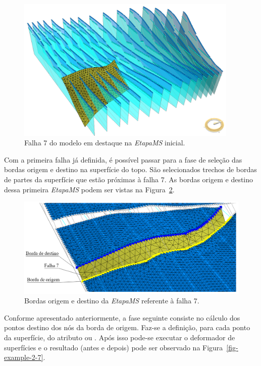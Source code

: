 \begin{figure} [H]
  \begin{center}
    \includegraphics[width=300pt]{images/fig-example-2-5}
    \caption{Falha 7 do modelo em destaque na \textit{EtapaMS} inicial.}\label{fig-example-2-5}
  \end{center}
\end{figure}

Com a primeira falha já definida, é possível passar para a fase de seleção das bordas origem e destino na superfície do topo. São selecionados trechos de bordas de partes da superfície que estão próximas à falha 7. As bordas origem e destino dessa primeira \textit{EtapaMS} podem ser vistas na Figura~\ref{fig-example-2-6}.

\begin{figure} [H]
  \begin{center}
    \includegraphics[width=350pt]{images/fig-example-2-6}
    \caption{Bordas origem e destino da \textit{EtapaMS} referente à falha 7.}\label{fig-example-2-6}
  \end{center}
\end{figure}

Conforme apresentado anteriormente, a fase seguinte consiste no cálculo dos pontos destino dos nós da borda de origem. Faz-se a definição, para cada ponto da superfície, do atributo  ou . Após isso pode-se executar o deformador de superfícies e o resultado (antes e depois) pode ser observado na Figura~\ref{fig-example-2-7}.

